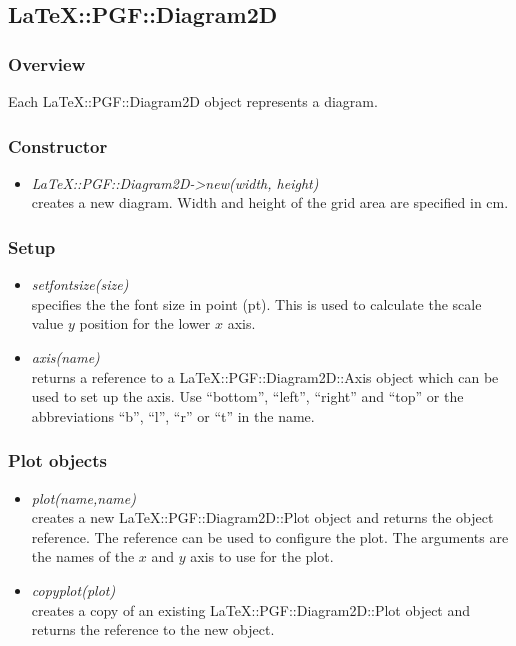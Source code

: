 \documentclass[origlongtable]{scrartcl}
\begin{document}
\subsection[Diagram]{LaTeX::PGF::Diagram2D}
\subsubsection{Overview}
Each LaTeX::PGF::Diagram2D object represents a diagram.
\subsubsection{Constructor}
\begin{itemize}
\item	\textit{LaTeX::PGF::Diagram2D-\textgreater{}new(width, height)\/}\\
creates a new diagram. Width and height of the grid area are specified
in cm.
\end{itemize}
\subsubsection{Setup}
\begin{itemize}
\item	\textit{set\textunderscore{}font\textunderscore{}size(size)\/}\\
specifies the the font size in point (pt). This is used to calculate
the scale value \(y\) position for the lower \(x\) axis.
\item	\textit{axis(name)\/}\\
returns a reference to a LaTeX::PGF::Diagram2D::Axis object which can
be used to set up the axis. Use ``bottom'', ``left'', ``right'' and ``top''
or the abbreviations ``b'', ``l'', ``r'' or ``t'' in the name.
\end{itemize}
\subsubsection{Plot objects}
\begin{itemize}
\item	\textit{plot(name,name)\/}\\
creates a new LaTeX::PGF::Diagram2D::Plot object and returns the object
reference. The reference can be used to configure the plot.
The arguments are the names of the \(x\) and \(y\) axis to use for the plot.
\item	\textit{copy\textunderscore{}plot(plot)\/}\\
creates a copy of an existing LaTeX::PGF::Diagram2D::Plot object and
returns the reference to the new object.
\end{itemize}
\end{document}

